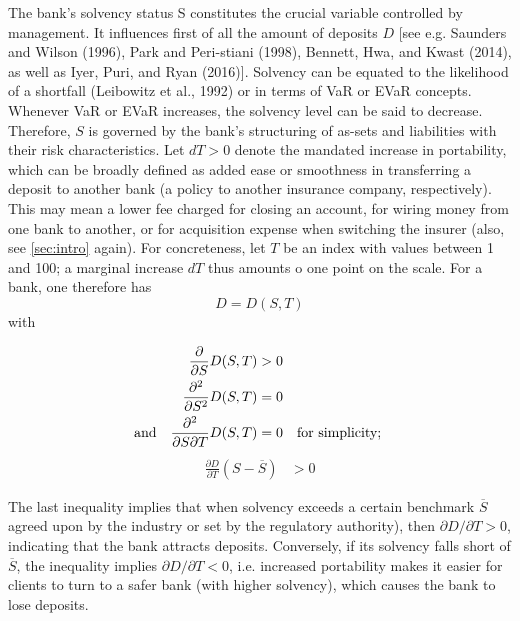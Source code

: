 The bank's solvency status S constitutes the crucial variable controlled by management. It influences first of all the amount of deposits $D$ [see e.g. Saunders and Wilson (1996), Park and Peri-stiani (1998), Bennett, Hwa, and Kwast (2014), as well as Iyer, Puri, and Ryan (2016)]. Solvency can be equated to the likelihood of a shortfall (Leibowitz et al., 1992) or in terms of \ac{VaR} or \ac{EVaR} concepts. Whenever \ac{VaR} or \ac{EVaR}  increases, the solvency level can be said to decrease. Therefore, $S$ is governed by the bank's structuring of as-sets and liabilities with their risk characteristics. Let $dT > 0$ denote the mandated increase in portability, which can be broadly defined as added ease or smoothness in transferring a deposit to another bank (a policy to another insurance company, respectively).  This may mean a lower fee charged for closing an account, for wiring money from one bank to another, or for acquisition expense when switching the insurer (also, see \autoref{sec:intro} again). For concreteness, let $T$ be an index with values between 1 and 100; a marginal increase $dT$ thus amounts o one point on the scale. 
For a bank, one therefore has  $$D=D(S,T)$$ with

\begin{align}
\frac{\partial}{\partial S} D(S,T) \nonumber &>  0 \\
\frac{\partial ^2}{\partial S^2} D(S,T)&=0 \nonumber \\
\text{and} \quad \frac{\partial^2}{\partial S \partial T} D(S,T) &= 0 \quad \text{for simplicity; \nonumber} 
\end{align}
\begin{align}
    \frac{\partial D}{\partial T}(S-\overline{S})  &> 0 \label{eq:Sbar} 
\end{align}


The last inequality implies that when solvency exceeds a certain benchmark $\overline{S}$ agreed upon by the industry or set by the regulatory authority), then $\partial D / \partial T >0$, indicating that the bank attracts deposits. Conversely, if its solvency falls short of $\overline{S}$, the inequality implies $\partial D / \partial T <0$, i.e. increased portability makes it easier for clients to turn to a safer bank (with higher solvency), which causes the bank to lose deposits. 

